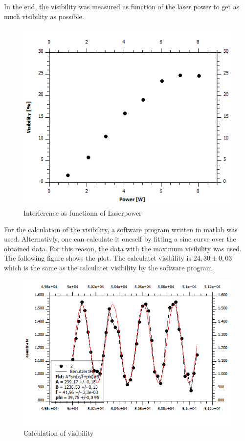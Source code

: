 \documentclass[12pt,a4paper]{article}
\begin{document}
\begin{multicols}{2}

In the end, the visibility was measured as function of the laser power to get as much visibility as possible.
\begin{figure}[H]
\centering
\includegraphics[scale=0.65]{./data/Power.png}
\caption{Interference as functionn of Laserpower}
\label{fig:Laserpower}
\end{figure}

For the calculation of the visibility, a software program written in matlab was used. Alternativly, one can calculate it oneself by fitting a sine curve over the obtained data. For this reason, the data with the maximum visibility was used. The following figure shows the plot. The calculatet visibility is
$24,30\pm0,03$
which is the same as the calculatet visibility by the software program. 

\begin{figure}[H]
\centering
\includegraphics[scale=0.60]{./data/Sinfit.png}
\caption{Calculation of visibility}
\label{fig:Sinfit}
\end{figure}





\end{multicols}
\end{document}
